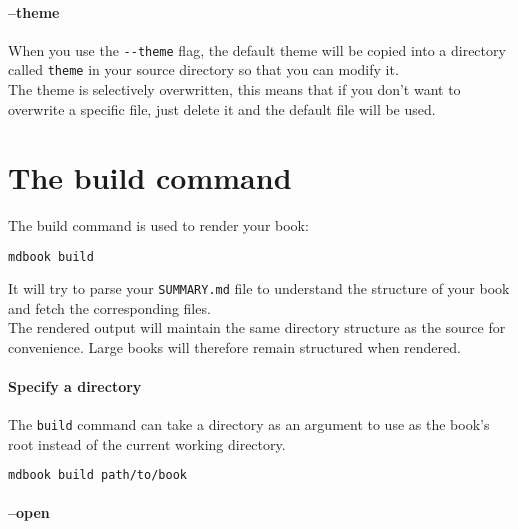 \documentclass{article}
\begin{document}
\paragraph{--theme}
\label{--theme}
\label{theme}

When you use the \lstinline|--theme| flag, the default theme will be copied into a
directory called \lstinline|theme| in your source directory so that you can modify it.\\

The theme is selectively overwritten, this means that if you don't want to
overwrite a specific file, just delete it and the default file will be used.\\

\section{The build command}
\label{The build command}
\label{the-build-command}

The build command is used to render your book:\\
\begin{lstlisting}[language=bash]
mdbook build

\end{lstlisting}

It will try to parse your \lstinline|SUMMARY.md| file to understand the structure of your
book and fetch the corresponding files.\\

The rendered output will maintain the same directory structure as the source for
convenience. Large books will therefore remain structured when rendered.\\

\paragraph{Specify a directory}
\label{Specify a directory}
\label{specify-a-directory}

The \lstinline|build| command can take a directory as an argument to use as the book's
root instead of the current working directory.\\
\begin{lstlisting}[language=bash]
mdbook build path/to/book

\end{lstlisting}

\paragraph{--open}
\label{--open}
\label{open}
\end{document}
